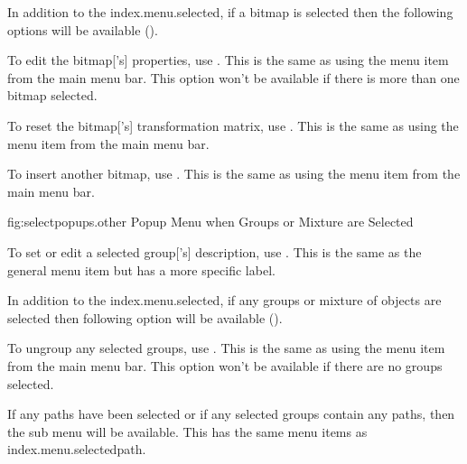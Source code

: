 In addition to the \gls{index.menu.selected},
if a \gls{bitmap} is selected then the following options will be available
().


To edit the \gls{bitmap}['s] properties, use
. This is the same as using
the  menu item from the main menu bar.
This option won't be available if there is more than one
\gls{bitmap} selected.


To reset the \gls{bitmap}['s]
transformation matrix, use . This is the
same as using the  menu item from the main menu
bar.


To insert another \gls{bitmap}, use . This is the
same as using the  menu item from the main menu
bar.



\FloatFig
  {fig:selectpopups.other}
  {}
  {Popup Menu when Groups or Mixture are Selected}


To set or edit a selected \gls{group}['s] description, use
. This is the same as
the general  menu item but has a more specific label.

In addition to the \gls{index.menu.selected},
if any \glspl{group} or mixture of \glspl{object} are selected 
then following option will be available
().


To ungroup any selected \glspl{group}, use
. This is the same as using the
 menu item from the main menu bar.
This option won't be available if there are no
\glspl{group} selected.


If any \glspl{path} have been selected or if any selected
\glspl{group} contain any \glspl{path}, then the
 sub menu will be available. This has the same
menu items as \gls{index.menu.selectedpath}.

